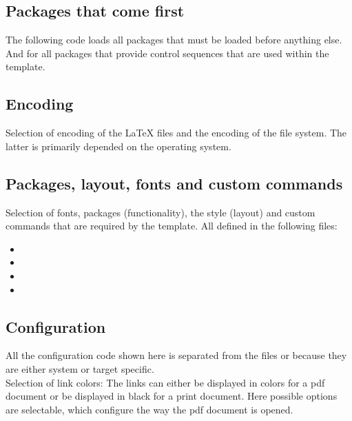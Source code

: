 \subsection{Packages that come first}
\label{sec:preamble:firstpackages}

The following code loads all packages that must be loaded before anything else.
And for all packages that provide control sequences that are used within the template.

\subsection{Encoding}
\label{sec:preamble:encoding}

Selection of encoding of the LaTeX files and the encoding of the file system. The latter is primarily depended on the operating system.

\subsection{Packages, layout, fonts and custom commands}
\label{sec:preamble:packages}

Selection of fonts, packages (functionality), the style (layout) and custom 
commands that are required by the template. All defined in the following files:
%
\begin{itemize}[noitemsep]
\item {}
\item {}
\item {}
\item {}
\end{itemize}


\subsection{Configuration}
\label{sec:preamble:configuration}
All the configuration code shown here is separated from the files  or  because they are either system or target specific.
\medskip\\\noindent
%
Selection of link colors: The links can either be displayed in colors for a pdf document or be displayed in black for a print document.
%
Here possible options are selectable, which configure the way the pdf document is opened.

